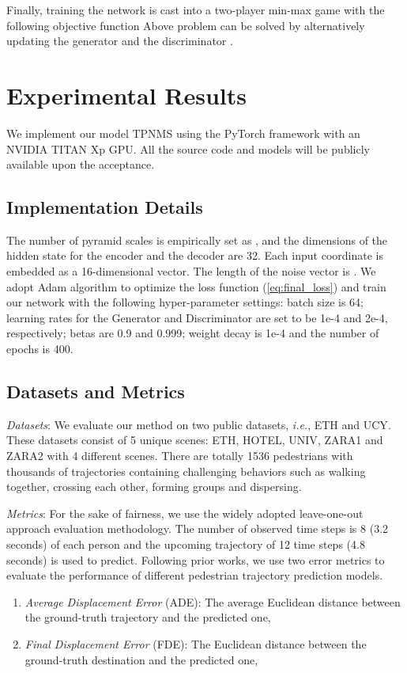 \documentclass[letterpaper]{article} \usepackage{aaai21}  \usepackage{times}  \usepackage{helvet} \usepackage{courier}  \usepackage[hyphens]{url}  \usepackage{graphicx} \urlstyle{rm} \def\UrlFont{\rm}  \usepackage{natbib}  \usepackage{caption} \frenchspacing  \setlength{\pdfpagewidth}{8.5in}  \setlength{\pdfpageheight}{11in}
\begin{document}
Finally, training the network is cast into a two-player min-max game with the following objective function
 Above problem can be solved by alternatively updating the generator  and the discriminator .



\section{Experimental Results}  \label{sec:experiment}
We implement our model TPNMS using the PyTorch framework with an NVIDIA TITAN Xp GPU.
All the source code and models will be publicly available upon the acceptance. 

\subsection{Implementation Details}
The number of pyramid scales is empirically set as , and the dimensions of the hidden state for the encoder and the decoder are 32. Each input coordinate  is embedded as a 16-dimensional vector. The length of the noise vector  is . We adopt Adam algorithm \cite{kingma2014adam} to optimize the loss function (\ref{eq:final_loss}) and train our network with the following hyper-parameter settings: batch size is 64; learning rates for the Generator and Discriminator are set to be 1e-4 and 2e-4, respectively; betas are 0.9 and 0.999; weight decay is 1e-4 and the number of epochs is 400. 
\subsection{Datasets and Metrics}
\textit{Datasets}: 
We evaluate our method on two public datasets, \textit{i.e.}, ETH\cite{pellegrini2009you} and UCY\cite{lerner2007crowds}. 
These datasets consist of 5 unique scenes: ETH, HOTEL, UNIV, ZARA1 and ZARA2 with 4 different scenes. There are totally 1536 pedestrians with thousands of trajectories containing challenging behaviors such as walking together, crossing each other, forming groups and dispersing. 



\textit{Metrics}: For the sake of fairness, we use the widely adopted leave-one-out approach evaluation methodology. 
The number of observed time steps is 8 (3.2 seconds) of each person and the upcoming trajectory of 12 time steps (4.8 seconds) is used to predict.
Following prior works, we use two error metrics to evaluate the performance of different pedestrian trajectory prediction models. 
\begin{enumerate}
	\item \textit{Average Displacement Error} (ADE): The average Euclidean distance between the ground-truth trajectory and the predicted one,\\
		
	\item \textit{Final Displacement Error} (FDE): The Euclidean distance between the ground-truth destination and the predicted one,\\
	
\end{enumerate}
\end{document}
